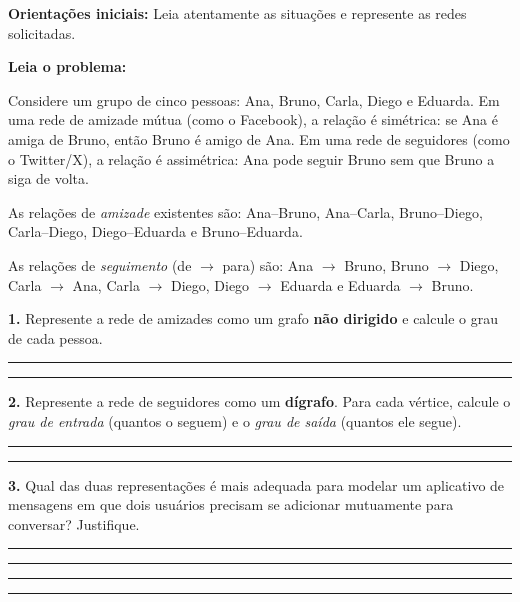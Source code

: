 \documentclass[
  12pt,
  oneside,
  a4paper,
  english,
  brazilian
  ]{abntex2}
\theoremstyle{definition}
\def\vspace#1{ }%
\begin{document}
\begin{apendicesenv}
\textbf{Orientações iniciais:} Leia atentamente as situações e represente as redes solicitadas.

\medskip

\textbf{Leia o problema:}

Considere um grupo de cinco pessoas: Ana, Bruno, Carla, Diego e Eduarda. Em uma rede de amizade mútua (como o Facebook), a relação é simétrica: se Ana é amiga de Bruno, então Bruno é amigo de Ana. Em uma rede de seguidores (como o Twitter/X), a relação é assimétrica: Ana pode seguir Bruno sem que Bruno a siga de volta.

As relações de \emph{amizade} existentes são:
Ana--Bruno, Ana--Carla, Bruno--Diego, Carla--Diego, Diego--Eduarda e Bruno--Eduarda.

As relações de \emph{seguimento} (de $\to$ para) são:
Ana $\to$ Bruno, Bruno $\to$ Diego, Carla $\to$ Ana, Carla $\to$ Diego, Diego $\to$ Eduarda e Eduarda $\to$ Bruno.

\textbf{1.} Represente a rede de amizades como um grafo \textbf{não dirigido} e calcule o grau de cada pessoa.

\vspace{5cm}
\noindent\rule{\textwidth}{0.4pt}\vspace{0.3cm}
\noindent\rule{\textwidth}{0.4pt}

\vspace{0.5cm}
\textbf{2.} Represente a rede de seguidores como um \textbf{dígrafo}. Para cada vértice, calcule o \emph{grau de entrada} (quantos o seguem) e o \emph{grau de saída} (quantos ele segue).

\vspace{6cm}
\noindent\rule{\textwidth}{0.4pt}\vspace{0.3cm}
\noindent\rule{\textwidth}{0.4pt}

\vspace{0.5cm}
\textbf{3.} Qual das duas representações é mais adequada para modelar um aplicativo de mensagens em que dois usuários precisam se adicionar mutuamente para conversar? Justifique.

\vspace{0.3cm}
\noindent\rule{\textwidth}{0.4pt}\vspace{0.3cm}
\noindent\rule{\textwidth}{0.4pt}\vspace{0.3cm}
\noindent\rule{\textwidth}{0.4pt}\vspace{0.3cm}
\noindent\rule{\textwidth}{0.4pt}

\newpage

\end{apendicesenv}
\end{document}
